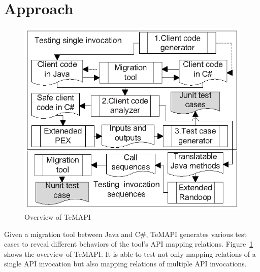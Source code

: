 \section{Approach}
\label{sec:approach}
\begin{figure}[t]
\centering
\includegraphics[scale=1,clip]{figure/approach.eps}\vspace*{-3ex}
 \caption{Overview of TeMAPI}\vspace*{-4ex}
 \label{fig:approach}
\end{figure}
Given a migration tool between Java and C\#, TeMAPI generates various test cases to reveal different behaviors of the tool's API mapping relations.
Figure~\ref{fig:approach} shows the overview of TeMAPI. It is able to test not only mapping relations of a single API invocation but also mapping relations of multiple API invocations.


